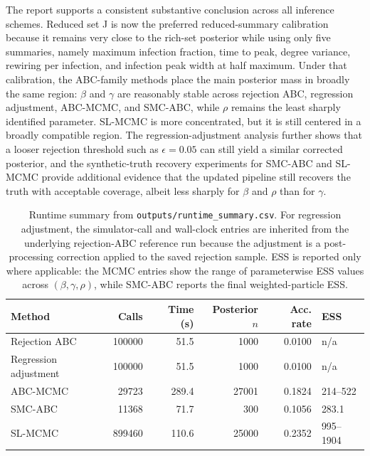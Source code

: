 \documentclass[11pt]{article}
\begin{document}
The report supports a consistent substantive conclusion across all inference schemes. Reduced set J is now the preferred reduced-summary calibration because it remains very close to the rich-set posterior while using only five summaries, namely maximum infection fraction, time to peak, degree variance, rewiring per infection, and infection peak width at half maximum. Under that calibration, the ABC-family methods place the main posterior mass in broadly the same region: $\beta$ and $\gamma$ are reasonably stable across rejection ABC, regression adjustment, ABC-MCMC, and SMC-ABC, while $\rho$ remains the least sharply identified parameter. SL-MCMC is more concentrated, but it is still centered in a broadly compatible region. The regression-adjustment analysis further shows that a looser rejection threshold such as $\epsilon=0.05$ can still yield a similar corrected posterior, and the synthetic-truth recovery experiments for SMC-ABC and SL-MCMC provide additional evidence that the updated pipeline still recovers the truth with acceptable coverage, albeit less sharply for $\beta$ and $\rho$ than for $\gamma$.

\begin{table}[H]
\centering
\small
\begin{tabular}{lrrrrl}
\hline
Method & Calls & Time (s) & Posterior $n$ & Acc. rate & ESS \\
\hline
Rejection ABC & 100000 & 51.5 & 1000 & 0.0100 & n/a \\
Regression adjustment & 100000 & 51.5 & 1000 & 0.0100 & n/a \\
ABC-MCMC & 29723 & 289.4 & 27001 & 0.1824 & 214--522 \\
SMC-ABC & 11368 & 71.7 & 300 & 0.1056 & 283.1 \\
SL-MCMC & 899460 & 110.6 & 25000 & 0.2352 & 995--1904 \\
\hline
\end{tabular}
\caption{Runtime summary from \texttt{outputs/runtime\_summary.csv}. For regression adjustment, the simulator-call and wall-clock entries are inherited from the underlying rejection-ABC reference run because the adjustment is a post-processing correction applied to the saved rejection sample. ESS is reported only where applicable: the MCMC entries show the range of parameterwise ESS values across $(\beta,\gamma,\rho)$, while SMC-ABC reports the final weighted-particle ESS.}
\label{tab:runtime-summary}
\end{table}
\end{document}
